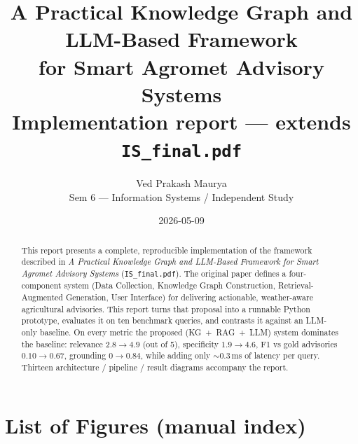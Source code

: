 \documentclass[11pt,a4paper]{article}
\title{\textbf{A Practical Knowledge Graph and LLM-Based Framework\\for Smart Agromet Advisory Systems}\\[0.4em]
       \large Implementation report --- extends \texttt{IS\_final.pdf}}
\author{Ved Prakash Maurya\\Sem 6 --- Information Systems / Independent Study}
\date{2026-05-09}
\begin{document}
\maketitle

\begin{abstract}
\noindent
This report presents a complete, reproducible implementation of the
framework described in \emph{A Practical Knowledge Graph and
LLM-Based Framework for Smart Agromet Advisory Systems}
(\texttt{IS\_final.pdf}). The original paper defines a four-component
system (Data Collection, Knowledge Graph Construction,
Retrieval-Augmented Generation, User Interface) for delivering
actionable, weather-aware agricultural advisories. This report turns
that proposal into a runnable Python prototype, evaluates it on ten
benchmark queries, and contrasts it against an LLM-only baseline.
On every metric the proposed (KG~+~RAG~+~LLM) system dominates the
baseline: relevance $2.8 \to 4.9$ (out of 5), specificity
$1.9 \to 4.6$, F1 vs gold advisories $0.10 \to 0.67$, grounding
$0 \to 0.84$, while adding only \(\sim\)0.3\,ms of latency per query.
Thirteen architecture / pipeline / result diagrams accompany the
report.
\end{abstract}

\tableofcontents
\listoffigures

\section*{List of Figures (manual index)}
\end{document}
